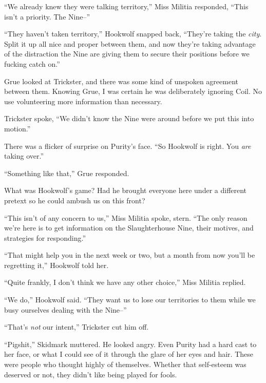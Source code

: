``We already knew they were talking territory,'' Miss Militia responded, ``This isn't a priority.  The Nine--''



``They haven't taken territory,'' Hookwolf snapped back, ``They're taking the \emph{city}.  Split it up all nice and proper between them, and now they're taking advantage of the distraction the Nine are giving them to secure their positions before we fucking catch on.''



Grue looked at Trickster, and there was some kind of unspoken agreement between them.  Knowing Grue, I was certain he was deliberately ignoring Coil.  No use volunteering more information than necessary.



Trickster spoke, ``We didn't know the Nine were around before we put this into motion.''



There was a flicker of surprise on Purity's face.  ``So Hookwolf is right.  You \emph{are} taking over.''



``Something like that,'' Grue responded.



What was Hookwolf's game?  Had he brought everyone here under a different pretext so he could ambush us on this front?



``This isn't of any concern to us,'' Miss Militia spoke, stern.  ``The only reason we're here is to get information on the Slaughterhouse Nine, their motives, and strategies for responding.''



``That might help you in the next week or two, but a month from now you'll be regretting it,'' Hookwolf told her.



``Quite frankly, I don't think we have any other choice,'' Miss Militia replied.



``We do,'' Hookwolf said.  ``They want us to lose our territories to them while we busy ourselves dealing with the Nine--''



``That's \emph{not} our intent,'' Trickster cut him off.



``Pigshit,'' Skidmark muttered.  He looked angry.  Even Purity had a hard cast to her face, or what I could see of it through the glare of her eyes and hair.  These were people who thought highly of themselves.  Whether that self-esteem was deserved or not, they didn't like being played for fools.



